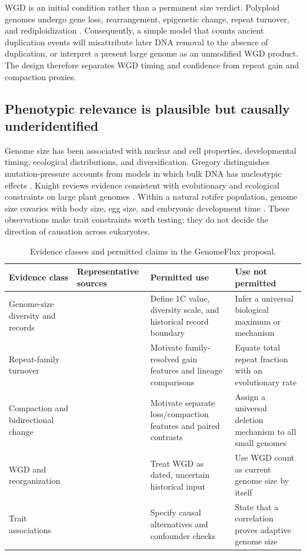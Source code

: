 \documentclass[conference]{IEEEtran}
\begin{document}
WGD is an initial condition rather than a permanent size verdict. Polyploid genomes undergo gene loss, rearrangement, epigenetic change, repeat turnover, and rediploidization \cite{soltis2003}. Consequently, a simple model that counts ancient duplication events will misattribute later DNA removal to the absence of duplication, or interpret a present large genome as an unmodified WGD product. The design therefore separates WGD timing and confidence from repeat gain and compaction proxies.

\subsection{Phenotypic relevance is plausible but causally underidentified}

Genome size has been associated with nuclear and cell properties, developmental timing, ecological distributions, and diversification. Gregory distinguishes mutation-pressure accounts from models in which bulk DNA has nucleotypic effects \cite{gregory2001}. Knight reviews evidence consistent with evolutionary and ecological constraints on large plant genomes \cite{knight2005}. Within a natural rotifer population, genome size covaries with body size, egg size, and embryonic development time \cite{stelzer2021}. These observations make trait constraints worth testing; they do not decide the direction of causation across eukaryotes.

\begin{table}[t]
\caption{Evidence classes and permitted claims in the GenomeFlux proposal.}
\label{tab:evidence}
\centering
\footnotesize
\renewcommand{\arraystretch}{1.12}
\begin{tabular}{|p{}|p{}|p{}|p{}|}
\hline
\textbf{Evidence class} & \textbf{Representative sources} & \textbf{Permitted use} & \textbf{Use not permitted} \\
\hline
Genome-size diversity and records & \cite{pellicer2018,fernandez2024} & Define 1C value, diversity scale, and historical record boundary & Infer a universal biological maximum or mechanism \\
\hline
Repeat-family turnover & \cite{kidwell2001,hawkins2006,macas2015,lee2014} & Motivate family-resolved gain features and lineage comparisons & Equate total repeat fraction with an evolutionary rate \\
\hline
Compaction and bidirectional change & \cite{ibarra2013,vu2015} & Motivate separate loss/compaction features and paired contrasts & Assign a universal deletion mechanism to all small genomes \\
\hline
WGD and reorganization & \cite{soltis2003,ibarra2013} & Treat WGD as dated, uncertain historical input & Use WGD count as current genome size by itself \\
\hline
Trait associations & \cite{gregory2001,knight2005,stelzer2021} & Specify causal alternatives and confounder checks & State that a correlation proves adaptive genome size \\
\hline
\end{tabular}
\end{table}
\end{document}
